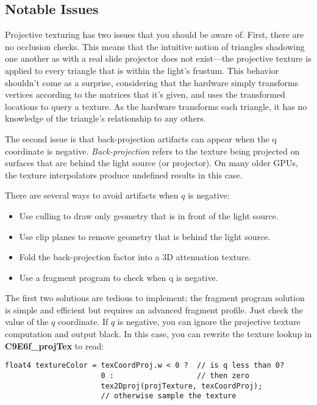 \documentclass[../main.tex]{subfiles}
\begin{document}
\subsection*{Notable Issues}

Projective texturing has two issues that you should be aware of. First, there are no occlusion checks. This means that the intuitive notion of triangles shadowing one another as with a real slide projector does not exist—the projective texture is applied to every triangle that is within the light's frustum. This behavior shouldn't come as a surprise, considering that the hardware simply transforms vertices according to the matrices that it's given, and uses the transformed locations to query a texture. As the hardware transforms each triangle, it has no knowledge of the triangle's relationship to any others.

The second issue is that back-projection artifacts can appear when the q coordinate is negative. \textit{Back-projection} refers to the texture being projected on surfaces that are behind the light source (or projector). On many older GPUs, the texture interpolators produce undefined results in this case.

There are several ways to avoid artifacts when $q$ is negative:
\begin{itemize}
\item Use culling to draw only geometry that is in front of the light source.
\item Use clip planes to remove geometry that is behind the light source.
\item Fold the back-projection factor into a 3D attenuation texture.
\item Use a fragment program to check when q is negative.
\end{itemize}

The first two solutions are tedious to implement; the fragment program solution is simple and efficient but requires an advanced fragment profile. Just check the value of the $q$ coordinate. If $q$ is negative, you can ignore the projective texture computation and output black. In this case, you can rewrite the texture lookup in \textbf{C9E6f_projTex} to read:

\FloatBarrier
\begin{lstlisting}
float4 textureColor = texCoordProj.w < 0 ?  // is q less than 0?
                      0 :                   // then zero
                      tex2Dproj(projTexture, texCoordProj);
                      // otherwise sample the texture
\end{lstlisting}
\FloatBarrier
\end{document}
